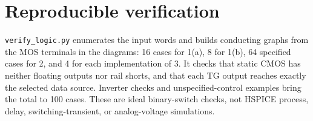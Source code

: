 \documentclass[11pt,a4paper]{article}
\begin{document}
\section*{Reproducible verification}
\texttt{verify\_logic.py} enumerates the input words and builds conducting graphs
from the MOS terminals in the diagrams: 16 cases for 1(a), 8 for 1(b), 64 specified
cases for 2, and 4 for each implementation of 3. It checks that static CMOS has
neither floating outputs nor rail shorts, and that each TG output reaches exactly
the selected data source. Inverter checks and unspecified-control examples bring
the total to 100 cases. These are ideal binary-switch checks, not HSPICE process,
delay, switching-transient, or analog-voltage simulations.
\end{document}
